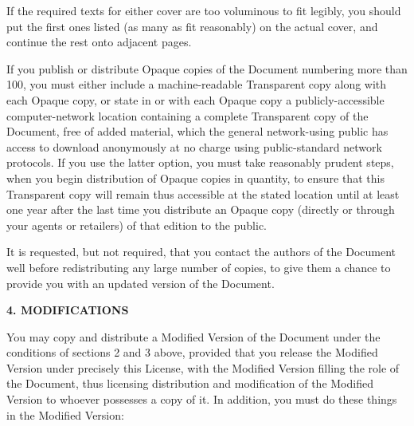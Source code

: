 If the required texts for either cover are too voluminous to fit
legibly, you should put the first ones listed (as many as fit
reasonably) on the actual cover, and continue the rest onto adjacent
pages.

If you publish or distribute Opaque copies of the Document numbering
more than 100, you must either include a machine-readable Transparent
copy along with each Opaque copy, or state in or with each Opaque copy
a publicly-accessible computer-network location containing a complete
Transparent copy of the Document, free of added material, which the
general network-using public has access to download anonymously at no
charge using public-standard network protocols.  If you use the latter
option, you must take reasonably prudent steps, when you begin
distribution of Opaque copies in quantity, to ensure that this
Transparent copy will remain thus accessible at the stated location
until at least one year after the last time you distribute an Opaque
copy (directly or through your agents or retailers) of that edition to
the public.

It is requested, but not required, that you contact the authors of the
Document well before redistributing any large number of copies, to give
them a chance to provide you with an updated version of the Document.


\begin{center}
{\Large\bf 4. MODIFICATIONS\par}
\end{center}

You may copy and distribute a Modified Version of the Document under
the conditions of sections 2 and 3 above, provided that you release
the Modified Version under precisely this License, with the Modified
Version filling the role of the Document, thus licensing distribution
and modification of the Modified Version to whoever possesses a copy
of it.  In addition, you must do these things in the Modified Version:

